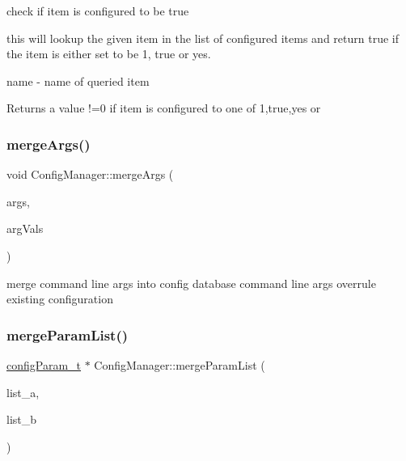 check if item is configured to be true 

this will lookup the given item in the list of configured items and return true if the item is either set to be \textquotesingle{}1\textquotesingle{}, \textquotesingle{}true\textquotesingle{} or \textquotesingle{}yes\textquotesingle{}.

\begin{DoxyItemize}
\item {\ttfamily name} -\/ name of queried item \begin{DoxyReturn}{Returns}
a value !=0 if item is configured to one of \textquotesingle{}1\textquotesingle{},\textquotesingle{}true\textquotesingle{},\textquotesingle{}yes\textquotesingle{} or \textquotesingle{}\textquotesingle{} 
\end{DoxyReturn}
\end{DoxyItemize}
\mbox{\label{classConfigManager_aa8cff61a46545834f88553cfb00beefd}} 
\subsubsection{\texorpdfstring{merge\+Args()}{mergeArgs()}}
{\footnotesize\ttfamily void Config\+Manager\+::merge\+Args (\begin{DoxyParamCaption}\item[{\hyperlink{CommandLineArgs_8h_aaee5f0d903dd3ebb586b68e0cd4d5594}{command\+Line\+Arg\+List\+\_\+t} $\ast$}]{args,  }\item[{\hyperlink{CommandLineArgs_8h_a092e791e8505f700f627414f125dcd6e}{command\+Line\+Arg\+Val\+List\+\_\+t} $\ast$}]{arg\+Vals }\end{DoxyParamCaption})}

merge command line args into config database command line args overrule existing configuration \mbox{\label{classConfigManager_af019debefe1c024dc6e222fd0cbd63ef}} 
\subsubsection{\texorpdfstring{merge\+Param\+List()}{mergeParamList()}}
{\footnotesize\ttfamily \hyperlink{structconfigParam__t}{config\+Param\+\_\+t} $\ast$ Config\+Manager\+::merge\+Param\+List (\begin{DoxyParamCaption}\item[{\hyperlink{structconfigParam__t}{config\+Param\+\_\+t} $\ast$}]{list\+\_\+a,  }\item[{\hyperlink{structconfigParam__t}{config\+Param\+\_\+t} $\ast$}]{list\+\_\+b }\end{DoxyParamCaption})\hspace{0.3cm}{\ttfamily [static]}}

